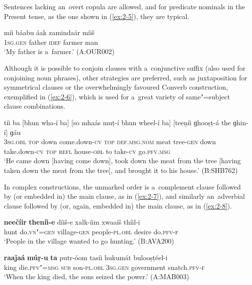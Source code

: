 Sentences lacking an~overt copula are allowed, and for predicate nominals in the Present tense, as the one shown in (\ref{ex:2-5}), they are typical.

\begin{exe}
\ex
\label{ex:2-5}
\gll míi báabu áak zamindaár míiš \\ 
\textsc{1sg.gen} father \textsc{idef} farmer man \\
\glt `My father is a~farmer.' (A:OUR002)
\end{exe}
Although it is possible to conjoin clauses with a~conjunctive suffix (also used for conjoining noun phrases), other strategies are preferred, such as juxtaposition for symmetrical clauses or the overwhelmingly favoured Converb construction, exemplified in (\ref{ex:2-6}), which is used for a~great variety of same"=subject clause combinations.

\begin{exe}
\ex
\label{ex:2-6}
\gll tíi ba [bhun wha-í ba] [so mhaás muṭ-í bhun wheel-í ba] [teeṇíi ɡhooṣṭ-á the ɡhin-í] ɡáu \\
\textsc{3sg.obl} \textsc{top} down come.down-\textsc{cv} \textsc{top} \textsc{def.msg.nom} meat tree-\textsc{gen} down take.down-\textsc{cv} \textsc{top} \textsc{refl} house-\textsc{obl} to take-\textsc{cv} go.\textsc{pfv.msg} \\
\glt `He came down [having come down], took down the meat from the tree [having taken down the meat from the tree], and brought it to his house.' (B:SHB762)
\end{exe}

In complex constructions, the unmarked order is a~complement clause followed by (or embedded in) the main clause, as in (\ref{ex:2-7}), and similarly an~adverbial clause followed by (or, again, embedded in) the main clause, as in (\ref{ex:2-8}). 

\begin{exe}
\ex
\label{ex:2-7}
\gll \textbf{neečíir} \textbf{theníi-e} díiš-e xalk-íim xwaaíš thíil-i \\
	hunt do.\textsc{vn"=gen} village\textsc{-gen} people\textsc{-pl.obl} desire do.\textsc{pfv-f} \\
\glt `People in the village wanted to go hunting.' (B:AVA200)
\end{exe}

\begin{exe}
\ex
\label{ex:2-8}
\gll \textbf{raaǰaá} \textbf{múṛ-u} \textbf{ta} putr-óom tasíi hukumát bulooṣṭéel-i \\
	king die.\textsc{pfv"=msg} \textsc{sub} son\textsc{-pl.obl} \textsc{3sg.gen} government snatch.\textsc{pfv-f} \\
\glt `When the king died, the sons seized the power.' (A:MAB003)
\end{exe}

